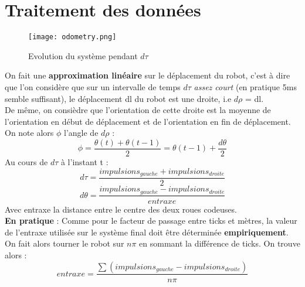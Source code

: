     \section{Traitement des données}
        \begin{figure}[h]
            \begin{center}
                \texttt{[image: odometry.png]}
            \end{center}

            \caption{Evolution du système pendant $d\tau$}
        \end{figure}
        On fait une \textbf{approximation linéaire} sur le déplacement du robot, c’est à dire que l’on considère que sur un intervalle de temps $d\tau$ \textit{assez court} (en pratique 5ms semble suffisant), le déplacement dl du robot est une droite, i.e $d\rho$ = dl.\\
        De même, on consièdre que l’orientation de cette droite est la moyenne de l’orientation en début de déplacement et de l’orientation en fin de déplacement. On note alors $\phi$ l’angle de $d\rho$ :
        $$
            \phi = \frac{\theta(t) + \theta(t-1)}{2} = \theta(t-1)+ \frac{d\theta}{2}
        $$
        Au cours de $d\tau$ à l’instant t :
        \begin{equation}
            d\tau = \frac{impulsions_{gauche} + impulsions_{droite}}{2}
        \end{equation}
        \begin{equation}
            d\theta = \frac{impulsions_{gauche} - impulsions_{droite}}{entraxe}
        \end{equation}
        Avec entraxe la distance entre le centre des deux roues codeuses.\\

        \textbf{En pratique} : Comme pour le facteur de passage entre ticks et mètres, la valeur de l’entraxe utilisée sur le système final doit être déterminée \textbf{empiriquement}. On fait alors tourner le robot sur $n\pi$ en sommant la différence de ticks. On trouve alors :
        \begin{equation}
            entraxe = \frac{\sum(impulsions_{gauche} - impulsions_{droite})}{n\pi}
        \end{equation}

